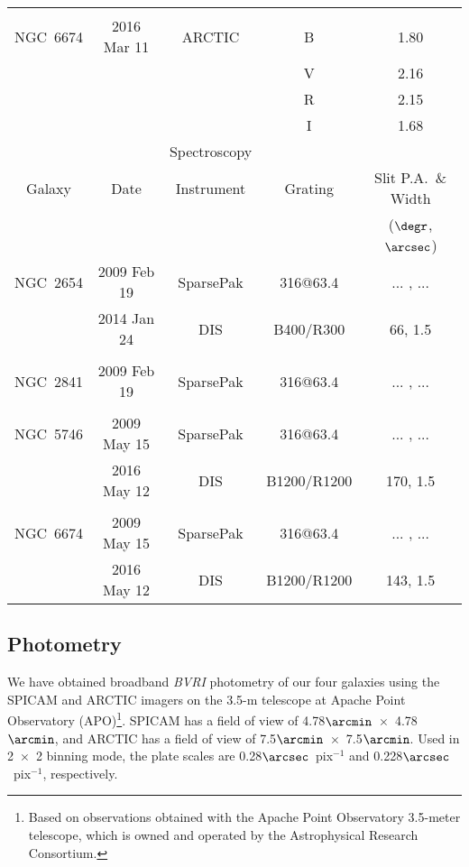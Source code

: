 \documentclass[a4paper,fleqn,usenatbib]{mnras}
\begin{document}
\begin{table*}
\begin{tabular}{ccccc}
	         			&				&			&		&\\
		NGC~6674 	&2016 Mar 11  		&ARCTIC   	&B 		&1.80\\
	                 		&                      		&                	&V 		&2.16\\ 
	                 		&                      		&                	&R 		&2.15\\ 
	                 		&                      		&                	&I  		&1.68\\       
		\hline
					&				&Spectroscopy	&		&\\
		\hline
		Galaxy 		&Date 			&Instrument 	&Grating 	&Slit P.A.\ \& Width \\
		                         &                        	&                       &            	&($\degr$, $\arcsec$)\\
		\hline
		NGC~2654 	&2009 Feb 19 		&SparsePak 	&316@63.4 	&... , ... \\
			 		&2014 Jan 24  		&DIS 		&B400/R300 	& 66, 1.5 \\
					&				&			&			&\\
		NGC~2841 	&2009 Feb 19 		&SparsePak 	&316@63.4 	&... , ... \\
					&				&			&			&\\
		NGC~5746 	&2009 May 15 		&SparsePak 	&316@63.4 	&... , ... \\
			 		&2016 May 12 		&DIS 		&B1200/R1200 &170, 1.5 \\
					&				&			&			&\\
		NGC~6674 	&2009 May 15 		&SparsePak 	&316@63.4 	&... , ... \\
			 		&2016 May 12 		&DIS 		&B1200/R1200 &143, 1.5\\
		\hline
	\end{tabular}
\end{table*}

\subsection{Photometry}
\label{sec:photometry}

We have obtained broadband \textit{BVRI} photometry of our four galaxies using the SPICAM and ARCTIC imagers on the 3.5-m telescope at Apache Point Observatory (APO)\footnote{Based on observations obtained with the Apache Point Observatory 3.5-meter telescope, which is owned and operated by the Astrophysical Research Consortium.}. SPICAM has a field of view of 4.78$\arcmin$~$\times$~4.78$\arcmin$, and ARCTIC has a field of view of 7.5$\arcmin$~$\times$~7.5$\arcmin$. Used in 2~$\times$~2 binning mode, the plate scales are 0.28$\arcsec$\ pix$^{-1}$ and 0.228$\arcsec$\ pix$^{-1}$, respectively. 
\end{document}
